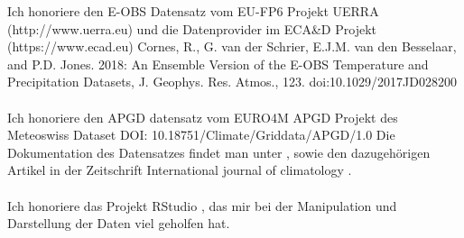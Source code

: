 
Ich honoriere den E-OBS Datensatz vom EU-FP6 Projekt UERRA (http://www.uerra.eu) und die Datenprovider im ECA\&D Projekt (https://www.ecad.eu) Cornes, R., G. van der Schrier, E.J.M. van den Besselaar, and P.D. Jones. 2018: An Ensemble Version of the E-OBS Temperature and Precipitation Datasets, J. Geophys. Res. Atmos., 123. doi:10.1029/2017JD028200
\cite[für weitere Informationen siehe][]{eobs}\\
\hfill\\
Ich honoriere den APGD datensatz vom EURO4M APGD Projekt des Meteoswiss
Dataset DOI: 10.18751/Climate/Griddata/APGD/1.0 Die Dokumentation des Datensatzes findet man unter \cite{apgd}, sowie den dazugehörigen Artikel in der Zeitschrift International journal of climatology \cite[siehe][]{apgd_article}. \cite[für weitere Informationen siehe:][]{meteoswiss}\\
\hfill\\
Ich honoriere das Projekt RStudio \cite{RStudio}, das mir bei der Manipulation und Darstellung der Daten viel geholfen hat.
